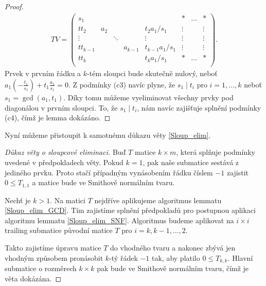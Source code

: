 \begin{proof}
\begin{align*}
TV =
    \left(
    \begin{array}{ccccc|ccc}
        s_1        &     &        &         &                 & \ast   & \hdots & \ast   \\
        tt_2       & a_2 &        &         & t_2 a_1/s_1     & \vdots &        & \vdots \\
        \vdots     &     & \ddots &         & \vdots          & \vdots &        & \vdots \\
        tt_{k - 1} &     &        & a_{k-1} & t_{k-1} a_1/s_1 & \vdots &        & \vdots \\
        tt_k       &     &        &         & t_k a_1/s_1     & \ast   & \hdots & \ast \\
    \end{array}
    \right)
.
\end{align*}
Prvek v prvním řádku a $ k $-tém sloupci bude skutečně nulový, neboť
$ a_1(-\frac{t_1}{s_1}) + t_1 \frac{a_1}{s_1} = 0 $. Z podmínky (c3) navíc plyne,
že $ s_1 \mid t_i $ pro $ i = 1,\dots, k $ neboť $ s_1 = \gcd(a_1, t_1) $.
Díky tomu můžeme vyeliminovat všechny prvky pod diagonálou v prvním sloupci.
To, že $ s_1 \mid t_i $, nám navíc zajišťuje splnění podmínky (c4), čímž je lemma
dokázáno.
\end{proof}

Nyní můžeme přistoupit k samotnému důkazu věty \ref{Sloup_elim}.
\begin{proof}[Důkaz věty o sloupcové eliminaci]
Buď $ T $ matice $ k \times m $, která splňuje podmínky uvedené v předpokladech
věty. Pokud $ k = 1 $, pak naše submatice sestává z jediného prvku. Proto
stačí případným vynásobením řádku číslem $ -1 $ zajistit $ 0 \leq T_{1,1} $
a matice bude ve Smithově normálním tvaru.

Nechť je $ k > 1 $. Na matici $ T $ nejdříve aplikujeme algoritmus lemmatu
\ref{Sloup_elim_GCD}. Tím zajistíme splnění předpokladů pro postupnou aplikaci
algoritmu lemmatu \ref{Sloup_elim_SNF}. Algoritmus budeme aplikovat na $ i \times i $
trailing submatice původní matice $ T $ pro $ i = k,k-1,\dots, 2 $.

Takto zajistíme úpravu matice $ T $ do vhodného tvaru a nakonec zbývá jen
vhodným způsobem pronásobit $ k $-tý řádek $ -1 $ tak, aby platilo
$ 0 \leq T_{k,k} $. Hlavní submatice o rozměrech $ k \times k $ pak bude
ve Smithově normálním tvaru, čímž je věta dokázána.
\end{proof}



